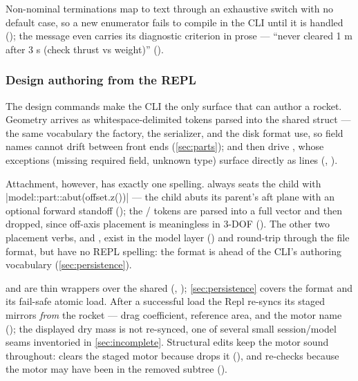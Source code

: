 Non-nominal terminations map to text through an exhaustive switch with no default case, so a
new  enumerator fails to compile in the CLI until it is handled
(); the  message even carries its diagnostic criterion
in prose --- ``never cleared 1 m after 3 s (check thrust vs weight)''
().

\subsubsection{Design authoring from the REPL}\label{sec:interfaces-cli-design}

The design commands make the CLI the only surface that can author a rocket. Geometry
arrives as whitespace-delimited  tokens parsed into the shared
 struct --- the same vocabulary the factory, the serializer, and the disk
format use, so field names cannot drift between front ends (\cref{sec:parts});
 and  then drive , whose
exceptions (missing required field, unknown type) surface directly as  lines
(, ).

Attachment, however, has exactly one spelling.  always seats the child with
\cppinline|model::part::abut(offset.z())| --- the child abuts its parent's aft plane with an
optional forward standoff  (); the / tokens
are parsed into a full vector and then dropped, since off-axis placement is meaningless in
3-DOF (). The other two placement verbs,  and
, exist in the model layer () and
round-trip through the file format, but have no REPL spelling: the  format is
ahead of the CLI's authoring vocabulary (\cref{sec:persistence}).

 and  are thin wrappers over the shared
 (, );
\cref{sec:persistence} covers the format and its fail-safe atomic load. After a successful
load the Repl re-syncs its staged mirrors \emph{from} the rocket --- drag coefficient,
reference area, and the motor name (); the displayed dry mass is not
re-synced, one of several small session/model seams inventoried in \cref{sec:incomplete}.
Structural edits keep the motor sound throughout:  clears the staged motor
because  drops it (), and  re-checks
 because the motor may have been in the removed subtree
().


